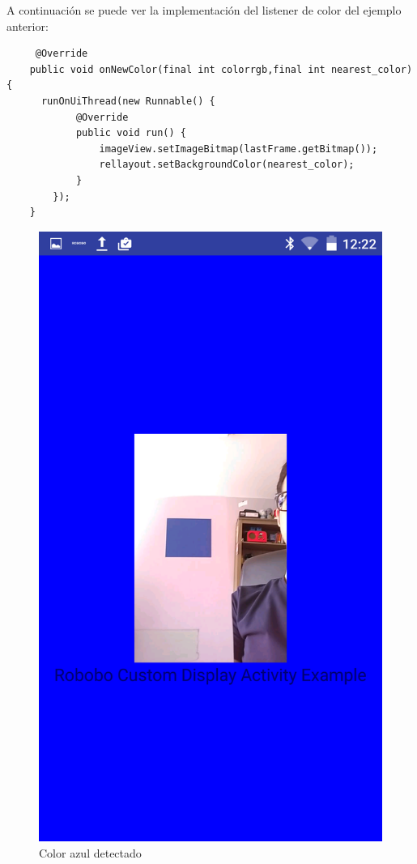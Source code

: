 A continuación se puede ver la implementación del listener de color del ejemplo anterior:

\begin{lstlisting}
	 @Override
    public void onNewColor(final int colorrgb,final int nearest_color) {
      runOnUiThread(new Runnable() {
            @Override
            public void run() {
                imageView.setImageBitmap(lastFrame.getBitmap());
                rellayout.setBackgroundColor(nearest_color);
            }
        });
    }
\end{lstlisting}



\begin{figure}
\centering
\begin{minipage}{0.45\textwidth}
\centering
\includegraphics[width=1\linewidth]{imagenes/color_detection_blue.png}
\caption{Color azul detectado}
\label{fig:blue_color}


\end{minipage}
\end{figure}
